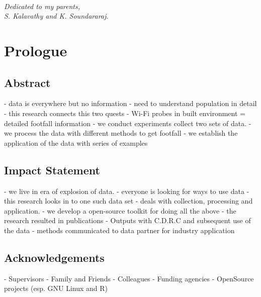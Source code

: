 \cleardoublepage
~\vfill
\begin{doublespace}
\noindent\fontsize{12}{12}\selectfont\itshape \nohyphenation
\noindent Dedicated to my parents,\\
\noindent S. Kalavathy and K. Soundararaj.
\end{doublespace}
\vfill
\vfill


\chapter*{Prologue}
\section*{Abstract} %
 - data is everywhere but no information
 - need to understand population in detail
 - this research connects this two quests
 - Wi-Fi probes in built environment = detailed footfall information
 - we conduct experiments collect two sets of data.
 - we process the data with different methods to get footfall
 - we establish the application of the data with series of examples


\section*{Impact Statement} %
 - we live in era of explosion of data.
 - everyone is looking for ways to use data
 - this research looks in to one such data set
 - deals with collection, processing and application.
 - we develop a open-source toolkit for doing all the above
 - the research resulted in publications
 - Outputs with C.D.R.C and subsequent use of the data 
 - methods communicated to data partner for industry application  


\section*{Acknowledgements} %
 - Supervisors
 - Family and Friends
 - Colleagues
 - Funding agencies
 - OpenSource projects (esp. GNU Linux and R)
